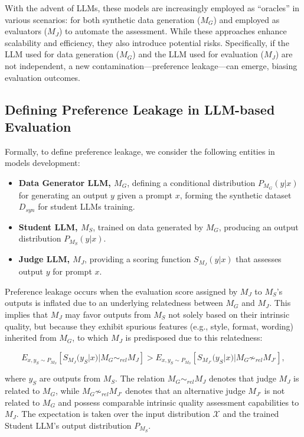 \documentclass{article} %
\begin{document}
With the advent of LLMs, these models are increasingly employed as ``oracles'' in various scenarios: for both synthetic data generation ($M_G$) and employed as evaluators ($M_J$) to automate the assessment. While these approaches enhance scalability and efficiency, they also introduce potential risks. Specifically, if the LLM used for data generation ($M_G$) and the LLM used for evaluation ($M_J$) are not independent, a new contamination—preference leakage—can emerge, biasing evaluation outcomes.

\subsection{Defining Preference Leakage in LLM-based Evaluation}

Formally, to define preference leakage, we consider the following entities in models development:

\begin{itemize}[leftmargin=*,itemsep=1pt,topsep=2pt,parsep=1pt]
    \item \textbf{Data Generator LLM, $M_G$}, defining a conditional distribution $P_{M_G}(y|x)$ for generating an output $y$ given a prompt $x$, forming the synthetic dataset $D_{syn}$ for student LLMs training.
    \item \textbf{Student LLM, $M_S$}, trained on data generated by $M_G$, producing an output distribution $P_{M_S}(y|x)$.
    \item \textbf{Judge LLM, $M_J$}, providing a scoring function $S_{M_J}(y|x)$ that assesses output $y$ for prompt $x$.
\end{itemize}

Preference leakage occurs when the evaluation score assigned by $M_J$ to $M_S$'s outputs is inflated due to an underlying relatedness between $M_G$ and $M_J$. This implies that $M_J$ may favor outputs from $M_S$ not solely based on their intrinsic quality, but because they exhibit spurious features (e.g., style, format, wording) inherited from $M_G$, to which $M_J$ is predisposed due to this relatedness:

\begin{equation}
\label{eq:pref_leakage}
    E_{x, y_S \sim P_{M_S}}[S_{M_J}(y_S|x) | M_G \sim_{rel} M_J] > E_{x, y_S \sim P_{M_S}}[S_{M_{J'}}(y_S|x) | M_G \not\sim_{rel} M_{J'}],
\end{equation}

where $y_S$ are outputs from $M_S$. The relation $M_G \sim_{rel} M_J$ denotes that judge $M_J$ is related to $M_G$, while $M_G \not\sim_{rel} M_{J'}$ denotes that an alternative judge $M_{J'}$ is not related to $M_G$ and possess comparable intrinsic quality assessment capabilities to $M_J$. The expectation is taken over the input distribution $\mathcal{X}$ and the trained Student LLM's output distribution $P_{M_S}$.
\end{document}
